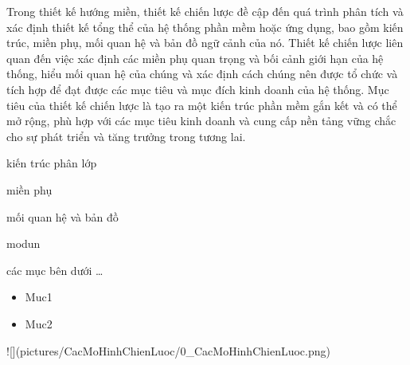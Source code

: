 

Trong thiết kế hướng miền, thiết kế chiến lược đề cập đến quá trình phân tích và xác định thiết kế tổng thể của hệ thống phần mềm hoặc ứng dụng, bao gồm kiến trúc, miền phụ, mối quan hệ và bản đồ ngữ cảnh của nó. Thiết kế chiến lược liên quan đến việc xác định các miền phụ quan trọng và bối cảnh giới hạn của hệ thống, hiểu mối quan hệ của chúng và xác định cách chúng nên được tổ chức và tích hợp để đạt được các mục tiêu và mục đích kinh doanh của hệ thống. Mục tiêu của thiết kế chiến lược là tạo ra một kiến trúc phần mềm gắn kết và có thể mở rộng, phù hợp với các mục tiêu kinh doanh và cung cấp nền tảng vững chắc cho sự phát triển và tăng trưởng trong tương lai.

%

kiến trúc phân lớp

miền phụ

mối quan hệ và bản đồ

modun

các mục bên dưới \dots

\begin{itemize}

\item Muc1

\item Muc2

\end{itemize}




![](pictures/CacMoHinhChienLuoc/0_CacMoHinhChienLuoc.png)






